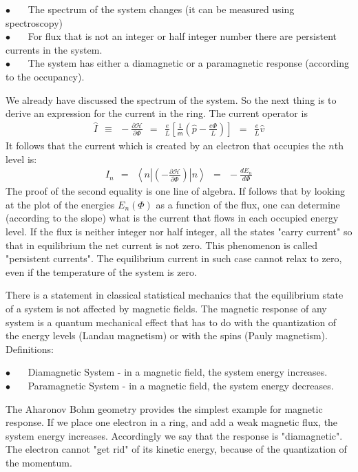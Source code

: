 \documentclass[onecolumn,fleqn, 11pt]{revtex4}
\newcommand{\mass}{\mathsf{m}}
\newcommand{\bitem}{$\bullet$ \ \ \ }
\newcommand{\beq}{\begin{eqnarray}}
\newcommand{\eeq}{\end{eqnarray}}
\begin{document}
\bitem The spectrum of the system changes 
(it can be measured using spectroscopy) \\
\bitem For flux that is not an integer or half integer number 
there are persistent currents in the system. \\
\bitem The system has either a diamagnetic 
or a paramagnetic response (according to the occupancy). 


We already have discussed the spectrum of the system.
So the next thing is to derive an expression for the 
current in the ring. The current operator is 
\beq
\hat{I}\ \ \equiv \ \  -\frac{\partial \mathcal{H}}{\partial \Phi} 
\ \ = \ \  \frac{e}{L} \left[\frac{1}{\mass}\left(\hat{p}-\frac{e\Phi}{L}\right)\right]
\ \ = \ \  \frac{e}{L}\hat{v} 
\eeq
It follows that the current which is created 
by an electron that occupies the $n$th level is:
\beq
I_n \ \ = \ \
\left\langle  n \left| \left(-\frac{\partial \mathcal{H}}{\partial \Phi}\right) \right| n \right\rangle 
\ \ = \ \  -\frac{d E_n}{d \Phi} 
\eeq
The proof of the second equality is one line of algebra.
If follows that by looking at the plot of the energies ${E_n(\Phi)}$ 
as a function of the flux, one can determine (according to the slope) 
what is the current that flows in each occupied energy level.
If the flux is neither integer nor half integer, 
all the states "carry current" so that in equilibrium 
the net current is not zero. This phenomenon is 
called "persistent currents". The equilibrium current 
in such case cannot relax to zero, 
even if the temperature of the system is zero. 


There is a statement in classical statistical mechanics that 
the equilibrium state of a system is not affected 
by magnetic fields. The magnetic response of any system 
is a quantum mechanical effect that has to do with the quantization 
of the energy levels (Landau magnetism) or with the spins (Pauly magnetism). 
Definitions: 

\bitem Diamagnetic System - in a magnetic field, the system energy increases. \\
\bitem Paramagnetic System - in a magnetic field, the system energy decreases. 

The Aharonov Bohm geometry provides the simplest example 
for magnetic response. If we place one electron in a ring, 
and add a weak magnetic flux, the system energy increases. 
Accordingly we say that the response is "diamagnetic". 
The electron cannot "get rid" of its kinetic energy, 
because of the quantization of the momentum. 
\end{document}
